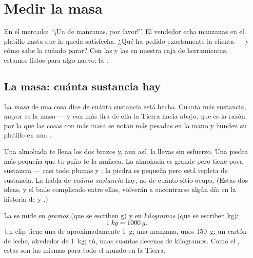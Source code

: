 \chapter{Medir la masa}\label{ch:g3:measuring-mass}

En el mercado: ``¡Un  de manzanas, por favor!''. El vendedor
echa manzanas en el platillo hasta que la  queda satisfecha.
¿Qué ha pedido exactamente la clienta --- y cómo sabe la 
cuándo parar? Con las  y las  en nuestra caja de
herramientas, estamos listos para  algo nuevo: la .

\section{La masa: cuánta sustancia hay}

\begin{definition}[La masa]\label{def:g3:measuring-mass:mass}
La \emph{masa} de una cosa dice de cuánta sustancia está
hecha. Cuanta más sustancia, mayor es la masa --- y con más 
tira de ella la Tierra hacia abajo, que es la razón por la que las
cosas con más masa se notan más pesadas en la mano y hunden su
platillo en una .
\end{definition}

\begin{example}\label{ex:g3:measuring-mass:bignotcheavy}
Una almohada te llena los dos brazos y, aun así, la llevas sin
esfuerzo. Una piedra más pequeña que tu puño te  la muñeca. La
almohada es grande pero tiene poca sustancia --- casi todo plumas y
; la piedra es pequeña pero está repleta de sustancia. La
 habla de \emph{cuánta sustancia} hay, no de cuánto sitio ocupa.
(Estas dos ideas, y el baile complicado entre ellas, volverán a
encontrarse algún día en la historia de  y .)
\end{example}

\begin{definition}\label{def:g3:measuring-mass:units}
La  se mide en \emph{gramos} (que se escriben
\unit{g}) y en \emph{kilogramos} (que se escriben
\unit{kg}):
\[
\qty{1}{kg} = \qty{1000}{g}.
\]
Un clip tiene una  de aproximadamente \qty{1}{g}; una manzana,
unos \qty{150}{g}; un cartón de leche, alrededor de \qty{1}{kg}; tú,
unas cuantas decenas de kilogramos. Como el , estas
 son las mismas para todo el mundo en la Tierra.
\end{definition}

